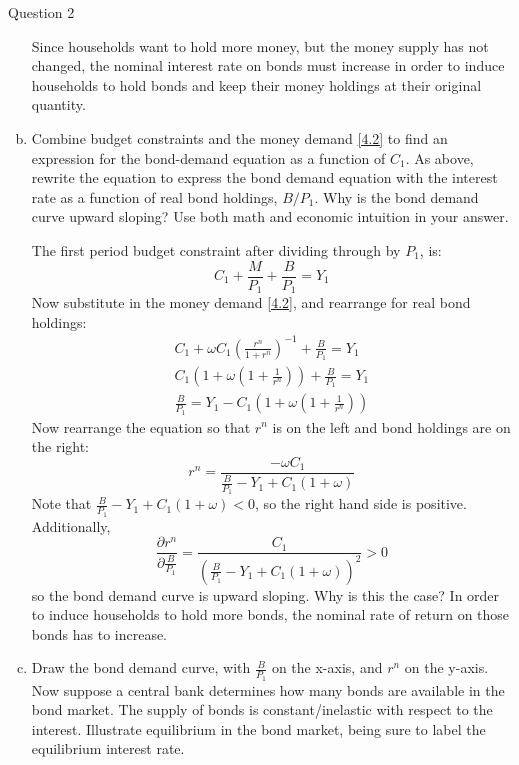 \documentclass[a4paper]{article}
\newif\IfInSansMode
\begin{document}
\begin{questionbox}{Question 2}
\begin{enumerate}[(a)]
\begin{explanationbox}
\begin{figure}[H]
				\end{figure}
				Since households want to hold more money, but the money supply has not changed, the nominal interest rate on bonds must increase in order to induce households to hold bonds and keep their money holdings at their original quantity.
			\end{explanationbox}
			\item Combine budget constraints and the money demand \cref{4.2} to find an expression for the bond-demand equation as a function of \( C_1 \). As above, rewrite the equation to express the bond demand equation with the interest rate as a function of real bond holdings, \( B/P_1 \). Why is the bond demand curve upward sloping? Use both math and economic intuition in your answer.
			\begin{explanationbox}
				The first period budget constraint after dividing through by \( P_1 \), is:
				\[
					C_1 + \frac{M}{P_1} + \frac{B}{P_1} = Y_1
				\]
				Now substitute in the money demand \cref{4.2}, and rearrange for real bond holdings:
				\begin{align*}
					C_1 + \omega C_1 \left( \frac{r^n}{1+r^n} \right)^{-1} + \frac{B}{P_1} = Y_1\\
					C_1 \left( 1 + \omega \left( 1 + \frac{1}{r^n} \right) \right) + \frac{B}{P_1} = Y_1\\
					\frac{B}{P_1} = Y_1 - C_1 \left( 1 + \omega \left( 1 + \frac{1}{r^n} \right) \right)
				\end{align*}
				Now rearrange the equation so that \( r^n \) is on the left and bond holdings are on the right:
				\[
					r^n = \frac{- \omega C_1}{\frac{B}{P_1} - Y_1 + C_1 (1 + \omega)}
				\]
				Note that \( \frac{B}{P_1} - Y_1 + C_1 (1 + \omega) < 0 \), so the right hand side is positive. Additionally,
				\[
					\frac{\partial r^n}{\partial \frac{B}{P_1}} = \frac{C_1}{\left( \frac{B}{P_1} - Y_1 + C_1 (1 + \omega) \right)^2} > 0
				\]
				so the bond demand curve is upward sloping. Why is this the case? In order to induce households to hold more bonds, the nominal rate of return on those bonds has to increase.
			\end{explanationbox}\pagebreak
			\item Draw the bond demand curve, with \( \frac{B}{P_1} \) on the x-axis, and \( r^n \) on the y-axis. Now suppose a central bank determines how many bonds are available in the bond market. The supply of bonds is constant/inelastic with respect to the interest. Illustrate equilibrium in the bond market, being sure to label the equilibrium interest rate.

\end{enumerate}
\end{questionbox}
\end{document}
